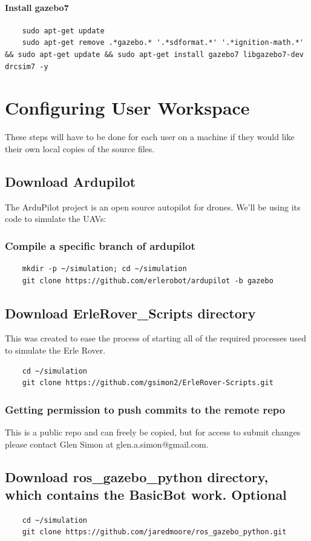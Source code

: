 \documentclass{report}
\begin{document}
\subsubsection{Install gazebo7}
\begin{lstlisting}
	sudo apt-get update
	sudo apt-get remove .*gazebo.* '.*sdformat.*' '.*ignition-math.*' && sudo apt-get update && sudo apt-get install gazebo7 libgazebo7-dev drcsim7 -y
\end{lstlisting}


\chapter{Configuring User Workspace}
These steps will have to be done for each user on a machine if they would like their own local copies of the source files.

\section{Download Ardupilot}
The ArduPilot project is an open source autopilot for drones. We'll be using its code to simulate the UAVs:
\subsection{Compile a specific branch of ardupilot}
\begin{lstlisting}
	mkdir -p ~/simulation; cd ~/simulation
	git clone https://github.com/erlerobot/ardupilot -b gazebo
\end{lstlisting}

\section{Download ErleRover\_Scripts directory}
This was created to ease the process of starting all of the required processes used to simulate the Erle Rover.
\begin{lstlisting}
	cd ~/simulation
	git clone https://github.com/gsimon2/ErleRover-Scripts.git
\end{lstlisting}
\subsection{Getting permission to push commits to the remote repo}
This is a public repo and can freely be copied, but for access to submit changes please contact Glen Simon at glen.a.simon@gmail.com.

\section{Download ros\_gazebo\_python directory, which contains the BasicBot work. Optional}
\begin{lstlisting}
	cd ~/simulation
	git clone https://github.com/jaredmoore/ros_gazebo_python.git
\end{lstlisting}
\end{document}

